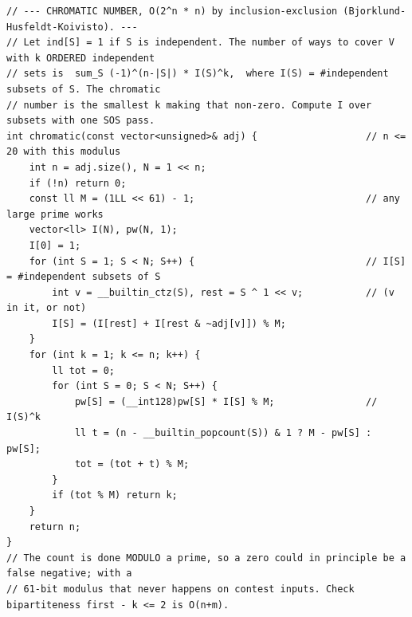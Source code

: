 \documentclass[9pt,a4paper,twocolumn]{extarticle}
\begin{document}
\begin{lstlisting}
// --- CHROMATIC NUMBER, O(2^n * n) by inclusion-exclusion (Bjorklund-Husfeldt-Koivisto). ---
// Let ind[S] = 1 if S is independent. The number of ways to cover V with k ORDERED independent
// sets is  sum_S (-1)^(n-|S|) * I(S)^k,  where I(S) = #independent subsets of S. The chromatic
// number is the smallest k making that non-zero. Compute I over subsets with one SOS pass.
int chromatic(const vector<unsigned>& adj) {                   // n <= 20 with this modulus
    int n = adj.size(), N = 1 << n;
    if (!n) return 0;
    const ll M = (1LL << 61) - 1;                              // any large prime works
    vector<ll> I(N), pw(N, 1);
    I[0] = 1;
    for (int S = 1; S < N; S++) {                              // I[S] = #independent subsets of S
        int v = __builtin_ctz(S), rest = S ^ 1 << v;           // (v in it, or not)
        I[S] = (I[rest] + I[rest & ~adj[v]]) % M;
    }
    for (int k = 1; k <= n; k++) {
        ll tot = 0;
        for (int S = 0; S < N; S++) {
            pw[S] = (__int128)pw[S] * I[S] % M;                // I(S)^k
            ll t = (n - __builtin_popcount(S)) & 1 ? M - pw[S] : pw[S];
            tot = (tot + t) % M;
        }
        if (tot % M) return k;
    }
    return n;
}
// The count is done MODULO a prime, so a zero could in principle be a false negative; with a
// 61-bit modulus that never happens on contest inputs. Check bipartiteness first - k <= 2 is O(n+m).


\end{lstlisting}
\end{document}
